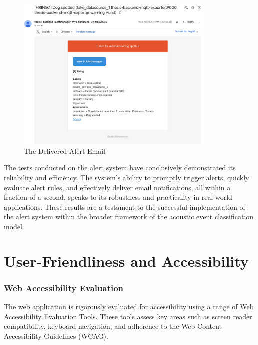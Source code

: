 \begin{figure}[htbp]
  \centering
  \includegraphics[width=0.85\textwidth]{Pictures/email}
  \caption{\label{fig:email}The Delivered Alert Email}
\end{figure}

The tests conducted on the alert system have conclusively demonstrated its reliability and efficiency. The system's ability to promptly trigger alerts, quickly evaluate alert rules, and effectively deliver email notifications, all within a fraction of a second, speaks to its robustness and practicality in real-world applications. These results are a testament to the successful implementation of the alert system within the broader framework of the acoustic event classification model.

\section{User-Friendliness and Accessibility}
\subsubsection{Web Accessibility Evaluation}
The web application is rigorously evaluated for accessibility using a range of Web Accessibility Evaluation Tools. These tools assess key areas such as screen reader compatibility, keyboard navigation, and adherence to the Web Content Accessibility Guidelines (WCAG).

